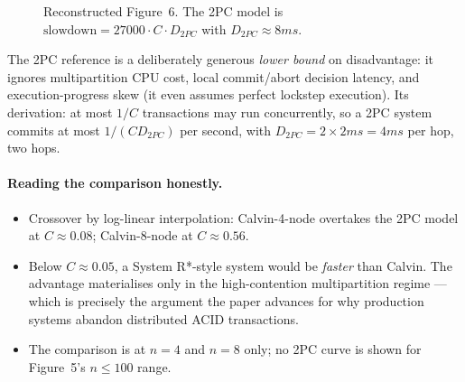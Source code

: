 \documentclass[11pt,a4paper]{article}
\newcommand{\hot}{C}
\begin{document}
\begin{figure}[H]
\centering
{}
\caption{Reconstructed Figure~6. The 2PC model is
$\text{slowdown} = \num{27000}\cdot\hot\cdot D_{2PC}$ with
$D_{2PC}\approx\si{8} ms$.}
\label{fig:fig6}
\end{figure}

The 2PC reference is a deliberately generous \emph{lower bound} on
disadvantage: it ignores multipartition CPU cost, local commit/abort decision
latency, and execution-progress skew (it even assumes perfect lockstep
execution). Its derivation: at most $1/\hot$ transactions may run
concurrently, so a 2PC system commits at most $1/(\hot D_{2PC})$ per second,
with $D_{2PC} = 2\times\si{2} ms = \si{4} ms$ per hop, two hops.

\paragraph{Reading the comparison honestly.}
\begin{itemize}[leftmargin=1.2em,itemsep=2pt]
\item Crossover by log-linear interpolation: Calvin-4-node overtakes the 2PC
      model at $\hot \approx 0.08$; Calvin-8-node at $\hot \approx 0.56$.
\item Below $\hot\approx0.05$, a System R*-style system would be
      \emph{faster} than Calvin. The advantage materialises only in the
      high-contention multipartition regime --- which is precisely the
      argument the paper advances for why production systems abandon
      distributed ACID transactions.
\item The comparison is at $n=4$ and $n=8$ only; no 2PC curve is shown for
      Figure~5's $n\le100$ range.
\end{itemize}
\end{document}
